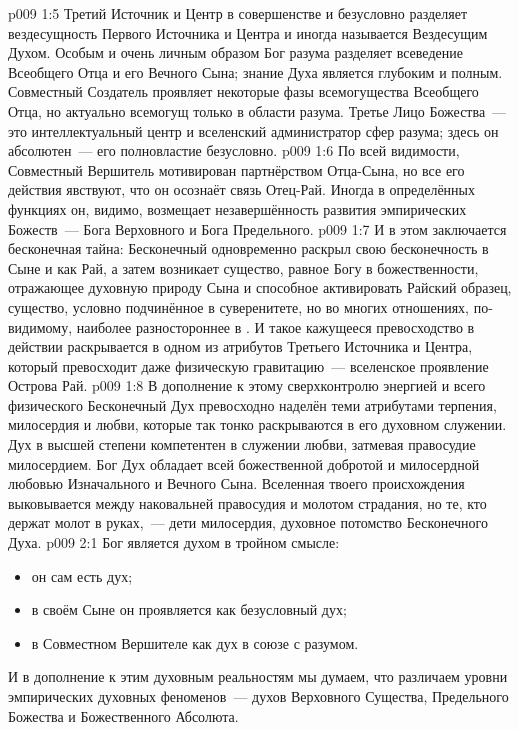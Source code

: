 \vs p009 1:5 \pc Третий Источник и Центр в совершенстве и безусловно разделяет вездесущность Первого Источника и Центра и иногда называется Вездесущим Духом. Особым и очень личным образом Бог разума разделяет всеведение Всеобщего Отца и его Вечного Сына; знание Духа является глубоким и полным. Совместный Создатель проявляет некоторые фазы всемогущества Всеобщего Отца, но актуально всемогущ только в области разума. Третье Лицо Божества~--- это интеллектуальный центр и вселенский администратор сфер разума; здесь он абсолютен~--- его полновластие безусловно.
\vs p009 1:6 По всей видимости, Совместный Вершитель мотивирован партнёрством Отца\hyp{}Сына, но все его действия явствуют, что он осознаёт связь Отец\hyp{}Рай. Иногда в определённых функциях он, видимо, возмещает незавершённость развития эмпирических Божеств~--- Бога Верховного и Бога Предельного.
\vs p009 1:7 \pc И в этом заключается бесконечная тайна: Бесконечный одновременно раскрыл свою бесконечность в Сыне и как Рай, а затем возникает существо, равное Богу в божественности, отражающее духовную природу Сына и способное активировать Райский образец, существо, условно подчинённое в суверенитете, но во многих отношениях, по\hyp{}видимому, наиболее разностороннее в . И такое кажущееся превосходство в действии раскрывается в одном из атрибутов Третьего Источника и Центра, который превосходит даже физическую гравитацию~--- вселенское проявление Острова Рай.
\vs p009 1:8 В дополнение к этому сверхконтролю энергией и всего физического Бесконечный Дух превосходно наделён теми атрибутами терпения, милосердия и любви, которые так тонко раскрываются в его духовном служении. Дух в высшей степени компетентен в служении любви, затмевая правосудие милосердием. Бог Дух обладает всей божественной добротой и милосердной любовью Изначального и Вечного Сына. Вселенная твоего происхождения выковывается между наковальней правосудия и молотом страдания, но те, кто держат молот в руках,~--- дети милосердия, духовное потомство Бесконечного Духа.
\vs p009 2:1 Бог является духом в тройном смысле:\begin{itemize}\item он сам есть дух; \item в своём Сыне он проявляется как безусловный дух; \item в Совместном Вершителе как дух в союзе с разумом.\end{itemize} И в дополнение к этим духовным реальностям мы думаем, что различаем уровни эмпирических духовных феноменов~--- духов Верховного Существа, Предельного Божества и Божественного Абсолюта.

